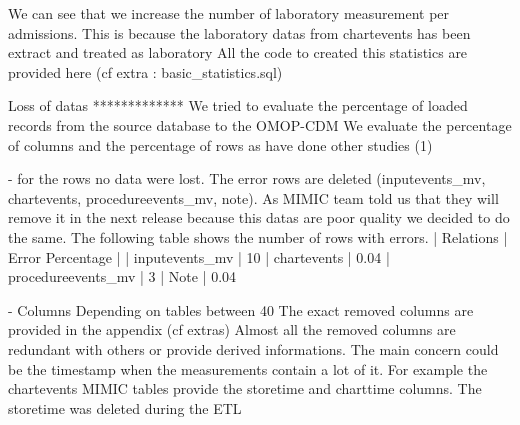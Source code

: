 We can see that we increase the number of laboratory measurement per admissions.
This is because the laboratory datas from chartevents has been extract and treated as laboratory
All the code to created this statistics are provided here (cf extra : basic_statistics.sql)

Loss of datas
*************
We tried to evaluate the percentage of loaded records from the source database to the OMOP-CDM
We evaluate the percentage of columns and the percentage of rows as have done other studies (1) 

- for the rows no data were lost. 
The error rows are deleted (inputevents_mv, chartevents, procedureevents_mv, note). As MIMIC team told us that they will remove it in the next release because this datas are poor quality we decided to do the same. 
The following table shows the number of rows with errors.
| Relations              | Error Percentage |
| inputevents_mv     | 10%
| chartevents        | 0.04%
| procedureevents_mv | 3%
| Note               | 0.04%

- Columns
Depending on tables between 40 %
The exact removed columns are provided in the appendix (cf extras)
Almost all the removed columns are redundant with others or provide derived informations. 
The main concern could be the timestamp when the measurements contain a lot of it.
For example the chartevents MIMIC tables provide the storetime and charttime columns. 
The storetime was deleted during the ETL

